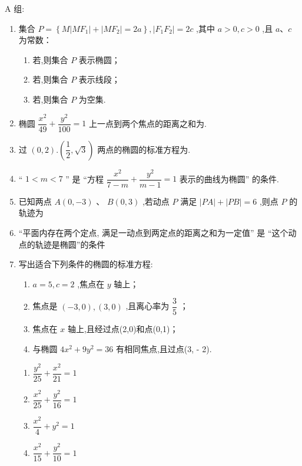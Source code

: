 A 组:
\begin{enumerate}

    \item 集合 $P = \left\{  {M\left| {M{F}_{1}}\right|  + \left| {M{F}_{2}}\right|  = {2a}}\right\}  ,\left| {{F}_{1}{F}_{2}}\right|  = {2c}$ ,其中 $a > 0,c > 0$ ,且 $a\text{、}c$ 为常数：
    \begin{enumerate}
        \item 若,则集合 $P$ 表示椭圆；
        \item 若,则集合 $P$ 表示线段；
        \item 若,则集合 $P$ 为空集.
    \end{enumerate}

    \item 椭圆 $\dfrac{{x}^{2}}{49} + \dfrac{{y}^{2}}{100} = 1$ 上一点到两个焦点的距离之和为.

    \item 过 $\left( {0,2}\right) .\left( {\dfrac{1}{2},\sqrt{3}}\right)$ 两点的椭圆的标准方程为.


    \item “ $1 < m < 7$ ” 是 “方程 $\dfrac{{x}^{2}}{7 - m} + \dfrac{{y}^{2}}{m - 1} = 1$ 表示的曲线为椭圆” 的条件.

    \item 已知两点 $A\left( {0, - 3}\right)$ 、 $B\left( {0,3}\right)$ ,若动点 $P$ 满足 $\left| {PA}\right|  + \left| {PB}\right|  = 6$ ,则点 $P$ 的轨迹为

    \item “平面内存在两个定点, 满足一动点到两定点的距离之和为一定值” 是 “这个动点的轨迹是椭圆”的条件

    \item 写出适合下列条件的椭圆的标准方程:
        \begin{enumerate}
            \item $a = 5,c = 2$ ,焦点在 $y$ 轴上； 
            \item 焦点是 $\left( {-3,0}\right) ,\left( {3,0}\right)$ ,且离心率为 $\dfrac{3}{5}$ ；
            \item 焦点在 $x$ 轴上,且经过点(2,0)和点(0,1)；
            \item 与椭圆 $4{x}^{2} + 9{y}^{2} = {36}$ 有相同焦点,且过点(3, - 2).
        \end{enumerate}
    \begin{jieda}
        \begin{enumerate}
            \item {$\dfrac{y^2}{25}+\dfrac{x^2}{21}=1$}
            \item {$\dfrac{x^2}{25}+\dfrac{y^2}{16}=1$}
            \item {$\dfrac{x^2}{4}+y^2=1$}
            \item {$\dfrac{x^2}{15}+\dfrac{y^2}{10}=1$}
        \end{enumerate}
    \end{jieda}
\end{enumerate}



